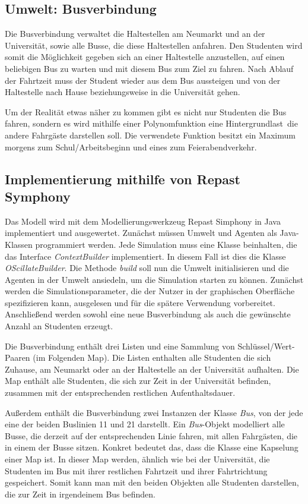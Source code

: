\documentclass[12pt,a4paper]{scrartcl}
\begin{document}
\subsection{Umwelt: Busverbindung}\label{bus}
Die Busverbindung verwaltet die Haltestellen am Neumarkt und an der Universität, sowie alle Busse, die diese Haltestellen anfahren. Den Studenten wird somit die Möglichkeit gegeben sich an einer Haltestelle anzustellen, auf einen beliebigen Bus zu warten und mit diesem Bus zum Ziel zu fahren. Nach Ablauf der Fahrtzeit muss der Student wieder aus dem Bus aussteigen und von der Haltestelle nach Hause beziehungsweise in die Universität gehen. 

Um der Realität etwas näher zu kommen gibt es nicht nur Studenten die Bus fahren, sondern es wird mithilfe einer Polynomfunktion eine \glqq Hintergrundlast\grqq~die andere Fahrgäste darstellen soll. Die verwendete Funktion besitzt ein Maximum morgens zum Schul/Arbeitsbeginn und eines zum Feierabendverkehr.

\subsection{Implementierung mithilfe von Repast Symphony}\label{repast}
Das Modell wird mit dem Modellierungswerkzeug Repast Simphony in Java implementiert und ausgewertet. Zunächst müssen Umwelt und Agenten als Java-Klassen programmiert werden. Jede Simulation muss eine Klasse beinhalten, die das Interface \textit{ContextBuilder} implementiert. In diesem Fall ist dies die Klasse \textit{OScillateBuilder}. Die Methode \textit{build} soll nun die Umwelt initialisieren und die Agenten in der Umwelt ansiedeln, um die Simulation starten zu können. Zunächst werden die Simulationsparameter, die der Nutzer in der graphischen Oberfläche spezifizieren kann, ausgelesen und für die spätere Verwendung vorbereitet. Anschließend werden sowohl eine neue Busverbindung als auch die gewünschte Anzahl an Studenten erzeugt.

Die Busverbindung enthält drei Listen und eine Sammlung von Schlüssel/Wert-Paaren (im Folgenden Map). Die Listen enthalten alle Studenten die sich Zuhause, am Neumarkt oder an der Haltestelle an der Universität aufhalten. Die Map enthält alle Studenten, die sich zur Zeit in der Universität befinden, zusammen mit der entsprechenden restlichen Aufenthaltsdauer.

Außerdem enthält die Busverbindung zwei Instanzen der Klasse \textit{Bus}, von der jede eine der beiden Buslinien 11 und 21 darstellt. Ein \textit{Bus}-Objekt modelliert alle Busse, die derzeit auf der entsprechenden Linie fahren, mit allen Fahrgästen, die in einem der Busse sitzen. Konkret bedeutet das, dass die Klasse eine Kapselung einer Map ist. In dieser Map werden, ähnlich wie bei der Universität, die Studenten im Bus mit ihrer restlichen Fahrtzeit und ihrer Fahrtrichtung gespeichert. Somit kann man mit den beiden Objekten alle Studenten darstellen, die zur Zeit in irgendeinem Bus befinden.
\end{document}
